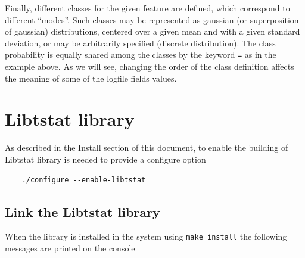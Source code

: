 \documentclass[11pt]{article}
\begin{document}
Finally, different classes for the given feature are defined, which correspond to different
``modes''. Such classes may be represented as gaussian (or superposition of gaussian) distributions,
centered over a given mean and with a  given standard deviation, or may be arbitrarily specified (discrete 
distribution). The class probability is equally shared among the classes by the keyword 
\texttt{=} as in the example above. As we will see, changing the order of the class definition
affects the meaning of some of the logfile fields values.

\section{Libtstat library\label{Libtstat_library}}


As described in the Install section of this document, to enable the building of
Libtstat library is needed to provide a configure option

\begin{small}\begin{verbatim}
    ./configure --enable-libtstat
\end{verbatim}\end{small} \noindent
\subsection{Link the Libtstat library\label{Link_the_Libtstat_library}}


When the library is installed in the system using \texttt{make install} the
following messages are printed on the console
\end{document}

